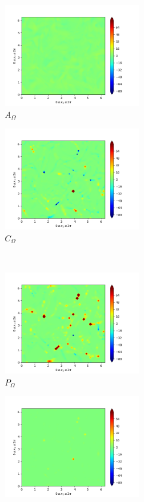 \begin{figure}[H]
\begin{subfigure}{0.45\textwidth}
        \includegraphics[height=1.75in]{media/run-cds-65/A-enst-1340.png}
        \caption{$A_{\Omega}$}
    \end{subfigure}
    \newline
    \begin{subfigure}{0.45\textwidth}
        \includegraphics[height=1.75in]{media/run-cds-65/Pi-enst-1340.png}
        \caption{$C_{\Omega}$}
    \end{subfigure}
    ~
    \begin{subfigure}{0.45\textwidth}
        \includegraphics[height=1.75in]{media/run-cds-65/P-enst-1340.png}
        \caption{$P_{\Omega}$}
    \end{subfigure}
    \newline
    \begin{subfigure}{0.45\textwidth}
        \includegraphics[height=1.75in]{media/run-cds-65/B-enst-1340.png}

\end{subfigure}
\end{figure}
